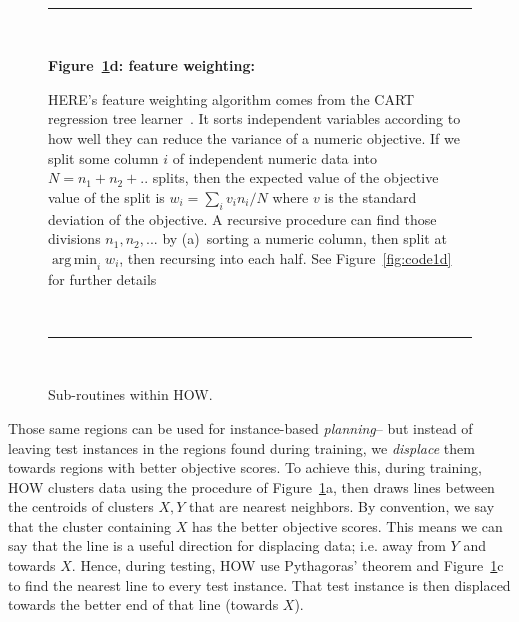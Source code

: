 \documentclass[conference]{IEEEtran}
\newcommand{\fig}[1]{Figure~\ref{fig:#1}}
\DeclareMathOperator*{\argmin}{arg\,min}
\begin{document}
\begin{figure}[t!]
~\hrule~

{\bf \fig{where}d: feature weighting:}

HERE's feature weighting algorithm
comes from the CART regression tree learner~\cite{Breiman1984}.
It sorts independent variables
 according to how well they can reduce the variance
of a  numeric objective.
If we split some column $i$ of independent numeric data  into $N=n_1 + n_2 + ..$ splits,
then the expected
value of the objective value of the split  is $w_i = \sum_i v_in_i/N$
where $v$ is the standard deviation of the objective.
A recursive procedure can  find those divisions $n_1,n_2,...$ by (a)~sorting a numeric column,
then split at $\argmin_i w_i$, then recursing into each half.  See \fig{code1d} for further details

~\hrule~
 
\caption{Sub-routines within HOW.}\label{fig:where}
\end{figure}





Those same regions can be used for instance-based 
{\em planning}-- but instead of leaving test instances in the regions
found during training, we {\em displace} them towards regions
with better objective scores.
To achieve this, 
during training, HOW clusters data using the procedure of \fig{where}a,
then draws lines between the centroids of  clusters $X,Y$ that are nearest
neighbors.
By convention, we say that the cluster containing $X$ has the  better objective scores. This means we can say that the line is a useful direction for displacing
data; i.e.  away from $Y$ and towards $X$.
Hence,  during testing,  HOW use Pythagoras' theorem
and \fig{where}c to find the  nearest line to every test instance. That test instance is   then displaced towards the better end
of that line (towards  $X$).
\end{document}
